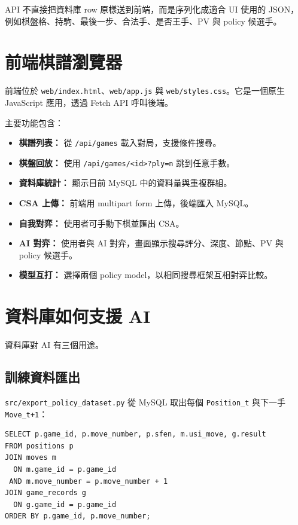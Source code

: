 \documentclass[12pt,a4paper,fontset=none]{ctexart}
\begin{document}
API 不直接把資料庫 row 原樣送到前端，而是序列化成適合 UI 使用的 JSON，例如棋盤格、持駒、最後一步、合法手、是否王手、PV 與 policy 候選手。

\section{前端棋譜瀏覽器}

前端位於 \texttt{web/index.html}、\texttt{web/app.js} 與 \texttt{web/styles.css}。它是一個原生 JavaScript 應用，透過 Fetch API 呼叫後端。

主要功能包含：

\begin{itemize}
  \item \textbf{棋譜列表：} 從 \texttt{/api/games} 載入對局，支援條件搜尋。
  \item \textbf{棋盤回放：} 使用 \texttt{/api/games/<id>?ply=n} 跳到任意手數。
  \item \textbf{資料庫統計：} 顯示目前 MySQL 中的資料量與重複群組。
  \item \textbf{CSA 上傳：} 前端用 multipart form 上傳，後端匯入 MySQL。
  \item \textbf{自我對弈：} 使用者可手動下棋並匯出 CSA。
  \item \textbf{AI 對弈：} 使用者與 AI 對弈，畫面顯示搜尋評分、深度、節點、PV 與 policy 候選手。
  \item \textbf{模型互打：} 選擇兩個 policy model，以相同搜尋框架互相對弈比較。
\end{itemize}

\section{資料庫如何支援 AI}

資料庫對 AI 有三個用途。

\subsection{訓練資料匯出}

\texttt{src/export\_policy\_dataset.py} 從 MySQL 取出每個 \texttt{Position\_t} 與下一手 \texttt{Move\_{t+1}}：

\begin{lstlisting}[style=cmd]
SELECT p.game_id, p.move_number, p.sfen, m.usi_move, g.result
FROM positions p
JOIN moves m
  ON m.game_id = p.game_id
 AND m.move_number = p.move_number + 1
JOIN game_records g
  ON g.game_id = p.game_id
ORDER BY p.game_id, p.move_number;
\end{lstlisting}
\end{document}
